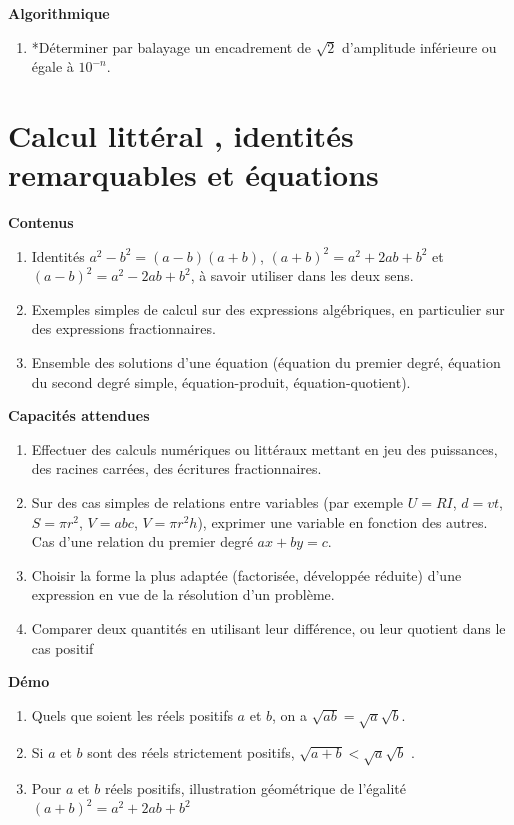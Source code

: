 \documentclass[10pt,a4paper]{article}
\begin{document}
\textbf{Algorithmique}

\begin{enumerate}
\item *Déterminer par balayage un encadrement de $\sqrt 2$ d'amplitude inférieure ou égale à $10^{-n}$.
\end{enumerate} 
 

\section{Calcul littéral , identités remarquables et équations}

\textbf{Contenus}

\begin{enumerate}
\item Identités $a^2-b^2=(a-b)(a+b)$, $(a + b)^2= a^2+ 2ab + b^2$ et $(a - b)^2= a^2- 2ab + b^2$, à savoir utiliser dans les deux sens.
\item Exemples simples de calcul sur des expressions algébriques, en particulier sur des expressions fractionnaires.
\item Ensemble des solutions d'une équation (équation du premier degré, équation du second degré simple, équation-produit, équation-quotient).
\end{enumerate}


\textbf{Capacités attendues}

\begin{enumerate}
\item Effectuer des calculs numériques ou littéraux mettant en jeu des puissances, des 
racines carrées, des écritures fractionnaires.
\item Sur des cas simples de relations entre variables (par exemple $U = RI$, $d = vt$, $S = \pi r^2$, $V = abc$, $V = \pi r^2h$), exprimer une variable en fonction des autres. Cas d’une relation du premier degré $ax + by = c$.
\item Choisir la forme la plus adaptée (factorisée, développée réduite) d'une expression en 
vue de la résolution d'un problème.
\item  Comparer deux quantités en utilisant leur différence, ou leur quotient dans le cas 
positif

\end{enumerate}

\textbf{Démo}

\begin{enumerate}
\item   Quels que soient les réels positifs $a$ et $b$, on a $\sqrt{ab} = \sqrt a  \sqrt b$.
\item   Si $a$ et $b$ sont des réels strictement positifs, $\sqrt{a+b} < \sqrt{a}\sqrt{b}$ .
\item   Pour $a$ et $b$ réels positifs, illustration géométrique de l'égalité $(a + b)^2= a^2+ 2ab + b^2$
\end{enumerate}
\end{document}
